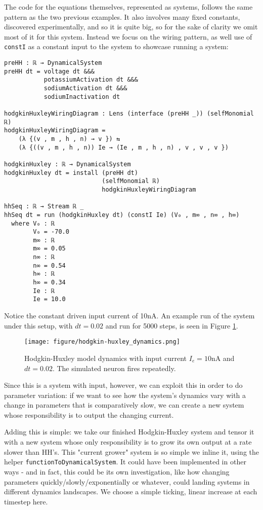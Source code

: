 The code for the equations themselves, represented as systems, follows the same pattern as the two previous examples. It also involves many fixed constants, discovered experimentally, and so it is quite big, so for the sake of clarity we omit most of it for this system. Instead we focus on the wiring pattern, as well use of \texttt{constI} as a constant input to the system to showcase running a system:
\begin{verbatim}
preHH : ℝ → DynamicalSystem
preHH dt = voltage dt &&& 
           potassiumActivation dt &&& 
           sodiumActivation dt &&&
           sodiumInactivation dt

hodgkinHuxleyWiringDiagram : Lens (interface (preHH _)) (selfMonomial ℝ)
hodgkinHuxleyWiringDiagram = 
    (λ {(v , m , h , n) → v }) ⇆ 
    (λ {((v , m , h , n)) Ie → (Ie , m , h , n) , v , v , v })

hodgkinHuxley : ℝ → DynamicalSystem
hodgkinHuxley dt = install (preHH dt)
                           (selfMonomial ℝ)
                           hodgkinHuxleyWiringDiagram

hhSeq : ℝ → Stream ℝ _
hhSeq dt = run (hodgkinHuxley dt) (constI Ie) (V₀ , m∞ , n∞ , h∞)
  where V₀ : ℝ
        V₀ = -70.0
        m∞ : ℝ
        m∞ = 0.05
        n∞ : ℝ
        n∞ = 0.54
        h∞ : ℝ
        h∞ = 0.34
        Ie : ℝ
        Ie = 10.0
\end{verbatim}

Notice the constant driven input current of 10nA. An example run of the system under this setup, with $dt = 0.02$ and run for 5000 steps, is seen in Figure \ref{fig:hhdynamics}.

\begin{figure}
    \centering
    \texttt{[image: figure/hodgkin-huxley\_dynamics.png]}
    \caption{Hodgkin-Huxley model dynamics with input current $I_e = 10$nA and $dt = 0.02$. The simulated neuron fires repeatedly.}
    \label{fig:hhdynamics}
\end{figure}

Since this is a system with input, however, we can exploit this in order to do parameter variation: if we want to see how the system's dynamics vary with a change in parameters that is comparatively slow, we can create a new system whose responsibility is to output the changing current.

Adding this is simple: we take our finished Hodgkin-Huxley system and tensor it with a new system whose only responsibility is to grow its own output at a rate slower than HH's. This "current grower" system is so simple we inline it, using the helper \texttt{functionToDynamicalSystem}. It could have been implemented in other ways - and in fact, this could be its own investigation, like how changing parameters quickly/slowly/exponentially or whatever, could landing systems in different dynamics landscapes. We choose a simple ticking, linear increase at each timestep here.


